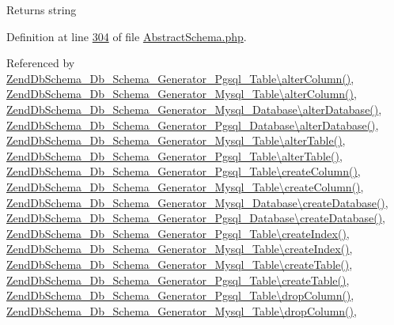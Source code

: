\begin{DoxyReturn}{Returns}
string 
\end{DoxyReturn}


Definition at line \hyperlink{AbstractSchema_8php_source_l00304}{304} of file \hyperlink{AbstractSchema_8php_source}{Abstract\-Schema.\-php}.



Referenced by \hyperlink{Generator_2Pgsql_2Table_8php_source_l00174}{Zend\-Db\-Schema\-\_\-\-Db\-\_\-\-Schema\-\_\-\-Generator\-\_\-\-Pgsql\-\_\-\-Table\textbackslash{}alter\-Column()}, \hyperlink{Generator_2Mysql_2Table_8php_source_l00182}{Zend\-Db\-Schema\-\_\-\-Db\-\_\-\-Schema\-\_\-\-Generator\-\_\-\-Mysql\-\_\-\-Table\textbackslash{}alter\-Column()}, \hyperlink{Generator_2Mysql_2Database_8php_source_l00064}{Zend\-Db\-Schema\-\_\-\-Db\-\_\-\-Schema\-\_\-\-Generator\-\_\-\-Mysql\-\_\-\-Database\textbackslash{}alter\-Database()}, \hyperlink{Generator_2Pgsql_2Database_8php_source_l00075}{Zend\-Db\-Schema\-\_\-\-Db\-\_\-\-Schema\-\_\-\-Generator\-\_\-\-Pgsql\-\_\-\-Database\textbackslash{}alter\-Database()}, \hyperlink{Generator_2Mysql_2Table_8php_source_l00074}{Zend\-Db\-Schema\-\_\-\-Db\-\_\-\-Schema\-\_\-\-Generator\-\_\-\-Mysql\-\_\-\-Table\textbackslash{}alter\-Table()}, \hyperlink{Generator_2Pgsql_2Table_8php_source_l00083}{Zend\-Db\-Schema\-\_\-\-Db\-\_\-\-Schema\-\_\-\-Generator\-\_\-\-Pgsql\-\_\-\-Table\textbackslash{}alter\-Table()}, \hyperlink{Generator_2Pgsql_2Table_8php_source_l00162}{Zend\-Db\-Schema\-\_\-\-Db\-\_\-\-Schema\-\_\-\-Generator\-\_\-\-Pgsql\-\_\-\-Table\textbackslash{}create\-Column()}, \hyperlink{Generator_2Mysql_2Table_8php_source_l00170}{Zend\-Db\-Schema\-\_\-\-Db\-\_\-\-Schema\-\_\-\-Generator\-\_\-\-Mysql\-\_\-\-Table\textbackslash{}create\-Column()}, \hyperlink{Generator_2Mysql_2Database_8php_source_l00038}{Zend\-Db\-Schema\-\_\-\-Db\-\_\-\-Schema\-\_\-\-Generator\-\_\-\-Mysql\-\_\-\-Database\textbackslash{}create\-Database()}, \hyperlink{Generator_2Pgsql_2Database_8php_source_l00038}{Zend\-Db\-Schema\-\_\-\-Db\-\_\-\-Schema\-\_\-\-Generator\-\_\-\-Pgsql\-\_\-\-Database\textbackslash{}create\-Database()}, \hyperlink{Generator_2Pgsql_2Table_8php_source_l00219}{Zend\-Db\-Schema\-\_\-\-Db\-\_\-\-Schema\-\_\-\-Generator\-\_\-\-Pgsql\-\_\-\-Table\textbackslash{}create\-Index()}, \hyperlink{Generator_2Mysql_2Table_8php_source_l00227}{Zend\-Db\-Schema\-\_\-\-Db\-\_\-\-Schema\-\_\-\-Generator\-\_\-\-Mysql\-\_\-\-Table\textbackslash{}create\-Index()}, \hyperlink{Generator_2Mysql_2Table_8php_source_l00038}{Zend\-Db\-Schema\-\_\-\-Db\-\_\-\-Schema\-\_\-\-Generator\-\_\-\-Mysql\-\_\-\-Table\textbackslash{}create\-Table()}, \hyperlink{Generator_2Pgsql_2Table_8php_source_l00038}{Zend\-Db\-Schema\-\_\-\-Db\-\_\-\-Schema\-\_\-\-Generator\-\_\-\-Pgsql\-\_\-\-Table\textbackslash{}create\-Table()}, \hyperlink{Generator_2Pgsql_2Table_8php_source_l00205}{Zend\-Db\-Schema\-\_\-\-Db\-\_\-\-Schema\-\_\-\-Generator\-\_\-\-Pgsql\-\_\-\-Table\textbackslash{}drop\-Column()}, \hyperlink{Generator_2Mysql_2Table_8php_source_l00213}{Zend\-Db\-Schema\-\_\-\-Db\-\_\-\-Schema\-\_\-\-Generator\-\_\-\-Mysql\-\_\-\-Table\textbackslash{}drop\-Column()}, 